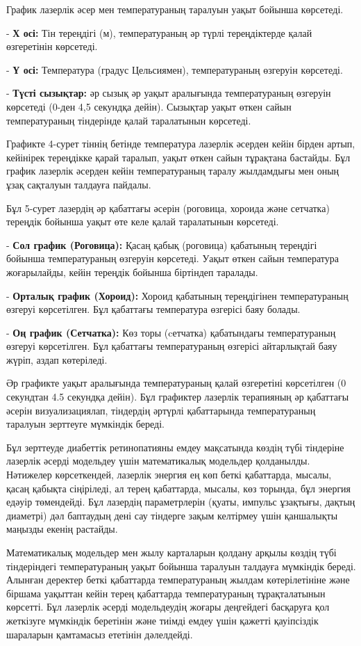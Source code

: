 \begin{multicols}{2}
График лазерлік әсер мен температураның таралуын уақыт бойынша
көрсетеді.

- {\bfseries Х осі:} Тін тереңдігі (м), температураның әр түрлі
тереңдіктерде қалай өзгеретінін көрсетеді.

- {\bfseries Ү осі:} Температура (градус Цельсиямен), температураның
өзгеруін көрсетеді.

- {\bfseries Түсті сызықтар:} әр сызық әр уақыт аралығында температураның
өзгеруін көрсетеді (0-ден 4,5 секундқа дейін). Сызықтар уақыт өткен
сайын температураның тіндерінде қалай таралатынын көрсетеді.

Графикте 4-сурет тіннің бетінде температура лазерлік әсерден кейін
бірден артып, кейінірек тереңдікке қарай таралып, уақыт өткен сайын
тұрақтана бастайды. Бұл график лазерлік әсерден кейін температураның
таралу жылдамдығы мен оның ұзақ сақталуын талдауға пайдалы.

Бұл 5-сурет лазердің әр қабаттағы әсерін (роговица, хороида және
сетчатка) тереңдік бойынша уақыт өте келе қалай таралатынын көрсетеді.

- {\bfseries Сол график (Роговица):} Қасаң қабық (роговица) қабатының
тереңдігі бойынша температураның өзгеруін көрсетеді. Уақыт өткен сайын
температура жоғарылайды, кейін тереңдік бойынша біртіндеп таралады.

- {\bfseries Орталық график (Хороид):} Хороид қабатының тереңдігінен
температураның өзгеруі көрсетілген. Бұл қабаттағы температура өзгерісі
баяу болады.

- {\bfseries Оң график (Сетчатка):} Көз торы (cетчатка) қабатындағы
температураның өзгеруі көрсетілген. Бұл қабаттағы температураның
өзгерісі айтарлықтай баяу жүріп, аздап көтеріледі.

Әр графикте уақыт аралығында температураның қалай өзгеретіні көрсетілген
(0 секундтан 4.5 секундқа дейін). Бұл графиктер лазерлік терапияның әр
қабаттағы әсерін визуализациялап, тіндердің әртүрлі қабаттарында
температураның таралуын зерттеуге мүмкіндік береді.

Бұл зерттеуде диабеттік ретинопатияны емдеу мақсатында көздің түбі
тіндеріне лазерлік әсерді модельдеу үшін математикалық модельдер
қолданылды. Нәтижелер көрсеткендей, лазерлік энергия ең көп беткі
қабаттарда, мысалы, қасаң қабықта сіңіріледі, ал терең қабаттарда,
мысалы, көз торында, бұл энергия едәуір төмендейді. Бұл лазердің
параметрлерін (қуаты, импульс ұзақтығы, дақтың диаметрі) дәл баптаудың
дені сау тіндерге зақым келтірмеу үшін қаншалықты маңызды екенің
растайды.

Математикалық модельдер мен жылу карталарын қолдану арқылы көздің түбі
тіндеріндегі температураның уақыт бойынша таралуын талдауға мүмкіндік
береді. Алынған деректер беткі қабаттарда температураның жылдам
көтерілетініне және біршама уақыттан кейін терең қабаттарда
температураның тұрақталатынын көрсетті. Бұл лазерлік әсерді модельдеудің
жоғары деңгейдегі басқаруға қол жеткізуге мүмкіндік беретінін және
тиімді емдеу үшін қажетті қауіпсіздік шараларын қамтамасыз ететінін
дәлелдейді.
\end{multicols}

